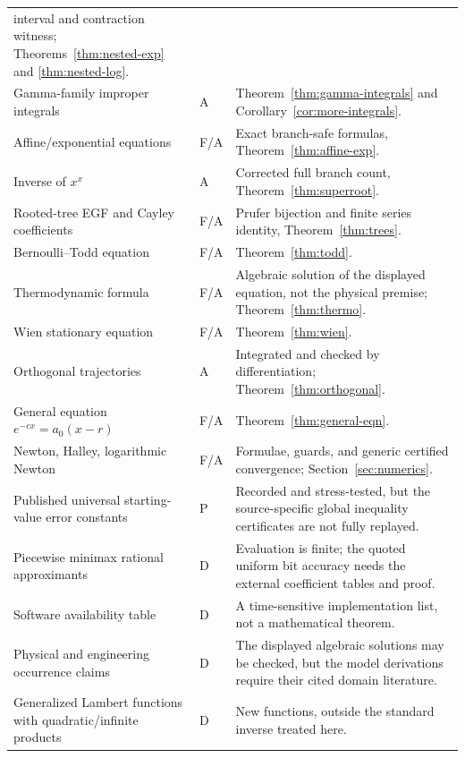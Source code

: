 \documentclass[11pt]{article}
\theoremstyle{definition}
\newcommand{\StatusF}{\textsf{F}}
\newcommand{\StatusA}{\textsf{A}}
\newcommand{\StatusP}{\textsf{P}}
\newcommand{\StatusD}{\textsf{D}}
\begin{document}
\begin{longtable}{>{\raggedright\arraybackslash}p{}
                  >{\centering\arraybackslash}p{}
                  >{\raggedright\arraybackslash}p{}}
interval and contraction witness; Theorems~\ref{thm:nested-exp} and
\ref{thm:nested-log}.\\
Gamma-family improper integrals & \StatusA & Theorem~\ref{thm:gamma-integrals}
and Corollary~\ref{cor:more-integrals}.\\
Affine/exponential equations & \StatusF/\StatusA & Exact branch-safe formulas,
Theorem~\ref{thm:affine-exp}.\\
Inverse of \(x^x\) & \StatusA & Corrected full branch count,
Theorem~\ref{thm:superroot}.\\
Rooted-tree EGF and Cayley coefficients & \StatusF/\StatusA & Prufer bijection
and finite series identity, Theorem~\ref{thm:trees}.\\
Bernoulli--Todd equation & \StatusF/\StatusA & Theorem~\ref{thm:todd}.\\
Thermodynamic formula & \StatusF/\StatusA & Algebraic solution of the displayed
equation, not the physical premise; Theorem~\ref{thm:thermo}.\\
Wien stationary equation & \StatusF/\StatusA & Theorem~\ref{thm:wien}.\\
Orthogonal trajectories & \StatusA & Integrated and checked by differentiation;
Theorem~\ref{thm:orthogonal}.\\
General equation \(e^{-cx}=a_0(x-r)\) & \StatusF/\StatusA &
Theorem~\ref{thm:general-eqn}.\\
Newton, Halley, logarithmic Newton & \StatusF/\StatusA & Formulae, guards, and
generic certified convergence; Section~\ref{sec:numerics}.\\
Published universal starting-value error constants & \StatusP & Recorded and
stress-tested, but the source-specific global inequality certificates are not
fully replayed.\\
Piecewise minimax rational approximants & \StatusD & Evaluation is finite; the
quoted uniform bit accuracy needs the external coefficient tables and proof.\\
Software availability table & \StatusD & A time-sensitive implementation list,
not a mathematical theorem.\\
Physical and engineering occurrence claims & \StatusD & The displayed algebraic
solutions may be checked, but the model derivations require their cited domain
literature.\\
Generalized Lambert functions with quadratic/infinite products & \StatusD & New
functions, outside the standard inverse treated here.\\
\bottomrule
\end{longtable}
\end{document}
